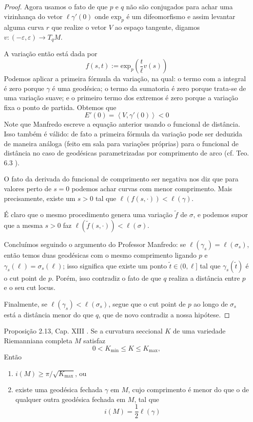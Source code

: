 \begin{proof}
Agora usamos o fato de que $p$ e $q$ não são
conjugados para
achar uma vizinhança do vetor $\ell
\gamma'(0)$ onde $\text{exp}_p$ é um
difeomorfismo e assim levantar alguma
curva $r$ que realize o vetor $V$ ao espaço
tangente,
 digamos $v:(-\varepsilon,\varepsilon) \to
 T_q M$.

A variação então está dada por
$$
f(s,t):=\text{exp}_p\left(\frac{t}{\ell}v(s)
\right)
$$
Podemos aplicar a primeira fórmula da
variação, na qual: o termo com a
integral é zero porque $\gamma$ é uma
geodésica; o termo da sumatoria é zero
porque trata-se de uma variação suave; e o
primeiro termo dos extremos é zero
porque a variação fixa o ponto de partida.
Obtemos que
$$
E'(0)=\left\langle{}V,\gamma'(0)\right\rangle{}<0
$$
Note que Manfredo escreve a equação anterior
usando o funcional de distância.
Isso também é válido: de fato a primeira
fórmula da variação pode ser
deduzida de maneira análoga (feito em sala
para variações próprias)
 para o funcional de distância no caso de
 geodésicas parametrizadas por
comprimento de arco (cf. Teo. 6.3
\cite{ler}).

O fato da derivada do funcional de
comprimento ser negativa nos diz que para
valores perto de $s=0$ podemos achar curvas
com menor comprimento. Mais
precisamente, existe um $s>0$ tal que
$\ell(f(s,\cdot))<\ell(\gamma)$.

É claro que o mesmo procedimento genera uma
variação $\tilde{f}$ de $\sigma$, e
podemos supor que a mesma $s>0$ faz
$\ell(\tilde{f}(s,\cdot))<\ell(\sigma)$.

Concluímos seguindo o argumento do Professor
Manfredo: se
$\ell(\gamma_s)=\ell(\sigma_s)$, então temos
duas geodésicas com o mesmo
comprimento ligando $p$ e
$\gamma_s(\ell)=\sigma_s(\ell)$; isso
significa
que existe um ponto $\tilde{t} \in (0,\ell]$
tal que $\gamma_s(\tilde{t})$ é
 o cut point de $p$. Porém, isso contradiz o
 fato de que $q$ realiza a
distância entre $p$ e o seu cut locus.

Finalmente, se
$\ell(\gamma_s)<\ell(\sigma_s)$, segue que o
cut point de $p$
 ao longo de $\sigma_s$ está a distância
 menor do que $q$, que de novo contradiz
a nossa hipótese.
\end{proof}

\begin{exercise}
\label{exercise-l8-2}
Proposição 2.13, Cap. XIII \cite{doc}. Se a
curvatura seccional $K$ de uma
variedade Riemanniana completa $M$ satisfaz
$$
0< K_{\text{min}}\leq K\leq K_{\text{max}},
$$
Então
\begin{enumerate}
\item $i(M) \geq \pi/\sqrt{K_{\text{max}}}$,
ou
\item existe uma geodésica fechada $\gamma$
em $M$, cujo comprimento é menor do
que o de qualquer outra geodésica fechada em
$M$, tal que
$$
i(M)=\frac{1}{2}\ell(\gamma)
$$
\end{enumerate}
\end{exercise}

